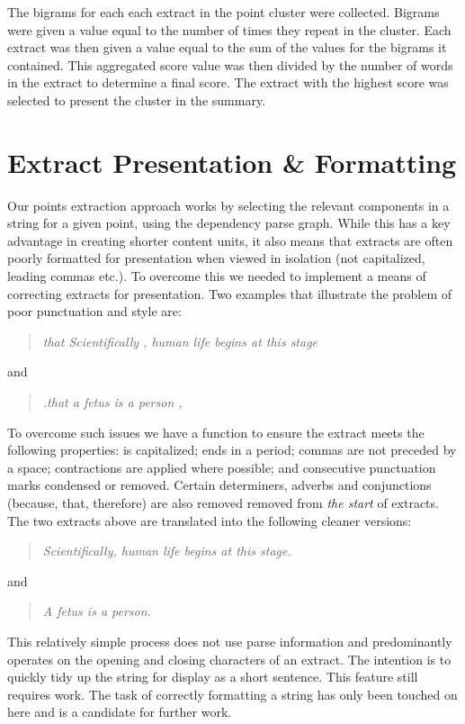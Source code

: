     The bigrams for each each extract in the point cluster were collected. Bigrams were given a value equal to the number of times they repeat in the cluster. Each extract was then given a value equal to the sum of the values for the bigrams it contained. This aggregated score value was then divided by the number of words in the extract to determine a final score. The extract with the highest score was selected to present the cluster in the summary.

  \section{Extract Presentation \& Formatting}
    Our points extraction approach works by selecting the relevant components in a string for a given point, using the dependency parse graph. While this has a key advantage in creating shorter content units, it also means that extracts are often poorly formatted for presentation when viewed in isolation (not capitalized, leading commas etc.). To overcome this we needed to implement a means of correcting extracts for presentation. Two examples that illustrate the problem of poor punctuation and style are: \blockquote{\textit{that Scientifically , human life begins at this stage}} and \blockquote{\textit{.that a fetus is a person ,}}.

    To overcome such issues we have a function to ensure the extract meets the following properties: is capitalized; ends in a period; commas are not preceded by a space; contractions are applied where possible; and consecutive punctuation marks condensed or removed. Certain determiners, adverbs and conjunctions (because, that, therefore) are also removed removed from \textit{the start} of extracts. The two extracts above are translated into the following cleaner versions: \blockquote{\textit{Scientifically, human life begins at this stage.}} and \blockquote{\textit{A fetus is a person.}}.

    This relatively simple process does not use parse information and predominantly operates on the opening and closing characters of an extract. The intention is to quickly tidy up the string for display as a short sentence. This feature still requires work. The task of correctly formatting a string has only been touched on here and is a candidate for further work.

